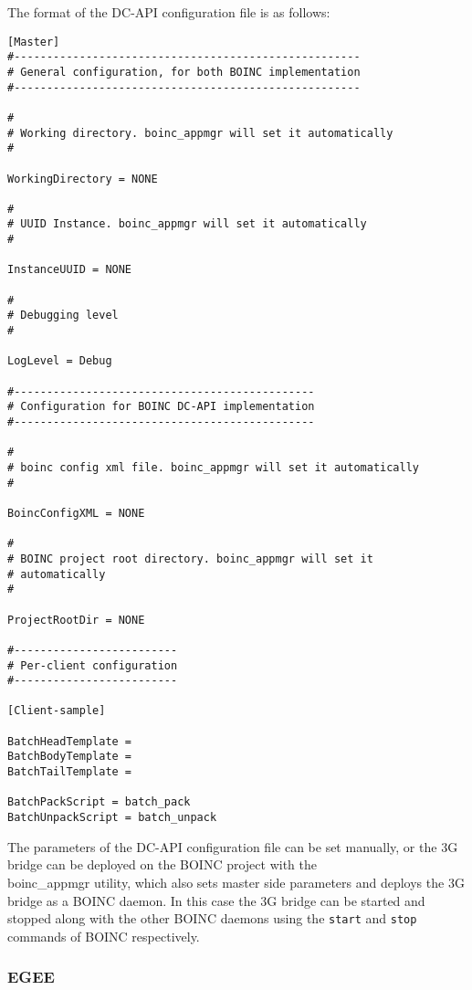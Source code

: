 \documentclass[a4paper, 12pt]{article}
\begin{document}
The format of the DC-API configuration file is as follows:

\begin{verbatim}
[Master]
#-----------------------------------------------------
# General configuration, for both BOINC implementation
#-----------------------------------------------------

#
# Working directory. boinc_appmgr will set it automatically
#

WorkingDirectory = NONE

#
# UUID Instance. boinc_appmgr will set it automatically
#

InstanceUUID = NONE

#
# Debugging level
#

LogLevel = Debug

#----------------------------------------------
# Configuration for BOINC DC-API implementation
#----------------------------------------------

#
# boinc config xml file. boinc_appmgr will set it automatically
#

BoincConfigXML = NONE

#
# BOINC project root directory. boinc_appmgr will set it 
# automatically
#

ProjectRootDir = NONE

#-------------------------
# Per-client configuration
#-------------------------

[Client-sample]

BatchHeadTemplate =
BatchBodyTemplate =
BatchTailTemplate =

BatchPackScript = batch_pack
BatchUnpackScript = batch_unpack
\end{verbatim}
The parameters of the DC-API configuration file can be set manually, or the 3G bridge can be deployed on the BOINC project with the \\ boinc\_appmgr utility, which also sets master side parameters and deploys the 3G bridge as a BOINC daemon. In this case the 3G bridge can be started and stopped along with the other BOINC daemons using the {\tt start} and {\tt stop} commands of BOINC respectively. 

\subsubsection{EGEE}
\end{document}
